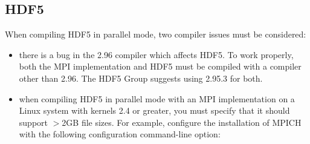 %
%
%

\subsection{HDF5}
\label{app:hdf5-overview}



When compiling HDF5 in parallel mode, two compiler issues must be
considered:

\begin{itemize}
\item there is a bug in the  2.96 compiler which affects
  HDF5.  To work properly, both the MPI implementation and HDF5 must
  be compiled with a compiler other than 2.96. The HDF5 Group suggests
  using  2.95.3 for both.
  
\item when compiling HDF5 in parallel mode with an MPI implementation
  on a Linux system with kernels 2.4 or greater, you must specify that
  it should support $>$2GB file sizes.  For example, configure the
  installation of MPICH with the following configuration command-line
  option:

\end{itemize}

